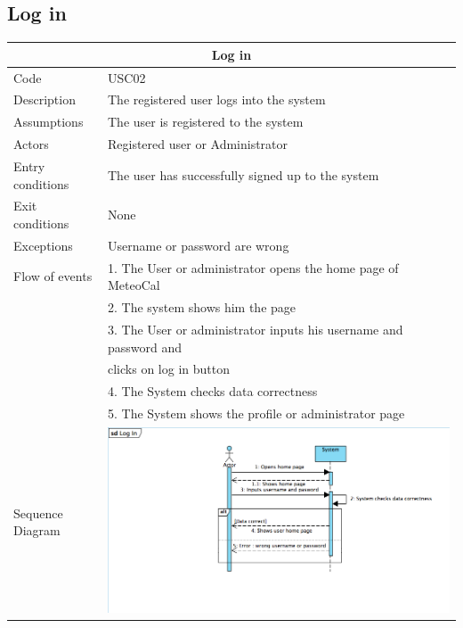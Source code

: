 \documentclass[12pt]{book}
\begin{document}
\subsection{Log in }
\begin{center}
\vspace*{\fill}
\begin{tabular}{ |l|l| }
  		\hline
  		\hline
  		\multicolumn{2}{|c|}{\large{\textbf{Log in}}} \\
  		\hline
  		\hline
  		Code  & USC02\\ 
		\hline
		Description & The registered user logs into the system\\
		\hline
		Assumptions & The user is registered to the system\\
		\hline
		Actors & Registered user or Administrator\\
		\hline
		Entry conditions & The user has successfully signed up to the system\\
		\hline
		Exit conditions & None \\
		\hline
		Exceptions & Username or password are wrong\\
		\hline
		Flow of events & 
			1. The User or administrator opens the home page of MeteoCal\\&
			2. The system shows him the page \\&
			3. The User or administrator inputs his username and password and  \\& clicks on log in button \\&
			4. The System checks data correctness\\&
			5. The System shows the profile or administrator page\\
  		\hline 
		Sequence Diagram &  \includegraphics[scale=0.45]{LogInSD} \\
		\hline
  		\hline
\end{tabular} \\
\vspace*{\fill}
\end{center}
\end{document}
